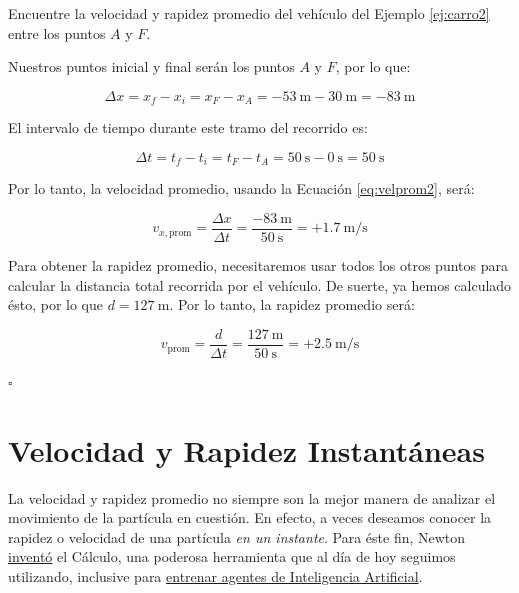 \begin{ejemplo}
Encuentre la velocidad y rapidez promedio del veh\'iculo del Ejemplo \ref{ej:carro2} entre los puntos $A$ y $F$.
\end{ejemplo}

\begin{solution*}

Nuestros puntos inicial y final ser\'an los puntos $A$ y $F$, por lo que:

\begin{equation*}
    \Delta x = x_{f}-x_{i}=x_{F} - x_{A} = \SI{-53}{\meter} - \SI{30}{\meter}=\SI{-83}{\meter}
\end{equation*}

El intervalo de tiempo durante este tramo del recorrido es:

\begin{equation*}
    \Delta t = t_{f}-t_{i}=t_{F} - t_{A} = \SI{50}{\second} - \SI{0}{\second}=\SI{50}{\second}
\end{equation*}

Por lo tanto, la velocidad promedio, usando la Ecuaci\'on \ref{eq:velprom2}, ser\'a:

\begin{equation*}
    v_{x, \text{prom}}= \frac{\Delta x}{\Delta t} = \frac{\SI{-83}{\meter}}{\SI{50}{\second}}=+\SI{1.7}{\meter/\second}
\end{equation*}

Para obtener la rapidez promedio, necesitaremos usar todos los otros puntos para calcular la distancia total recorrida por el veh\'iculo. De suerte, ya hemos calculado \'esto, por lo que $d=\SI{127}{\meter}$. Por lo tanto, la rapidez promedio ser\'a:

\begin{equation*}
    v_{\text{prom}}= \frac{d}{\Delta t} = \frac{\SI{127}{\meter}}{\SI{50}{\second}}=+\SI{2.5}{\meter/\second}
\end{equation*}

\hfill $\square$
\end{solution*}

\section{Velocidad y Rapidez Instant\'aneas}\label{sec:valrapinst2}

La velocidad y rapidez promedio no siempre son la mejor manera de analizar el movimiento de la part\'icula en cuesti\'on. En efecto, a veces deseamos conocer la rapidez o velocidad de una part\'icula \emph{en un instante}. Para \'este fin, Newton \href{https://www.youtube.com/watch?v=X_xR5Kes4Rs}{invent\'o} el C\'alculo, una poderosa herramienta que al d\'ia de hoy seguimos utilizando, inclusive para \href{https://towardsdatascience.com/gradient-descent-in-a-nutshell-eaf8c18212f0}{entrenar agentes de Inteligencia Artificial}. 

